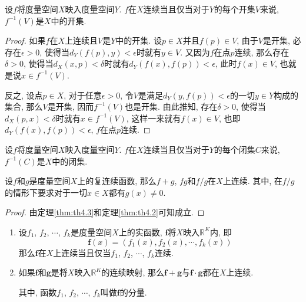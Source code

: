 \documentclass[cn,12pt,math=mtpro2,citestyle=gb7714-2015,bibstyle=gb7714-2015,twocol]{elegantbook}
\newcommand{\R}{\mathbb{R}}
\newcommand{\f}{\mathbold{f}}
\newcommand{\g}{\mathbold{g}}
\begin{document}
\begin{theorem}\label{thm:th4.5}
  设$f$将度量空间$X$映入度量空间$Y$. $f$在$X$连续当且仅当对于$Y$的每个开集$V$来说, $f^{-1}(V)$是$X$中的开集.
\end{theorem}
\begin{proof}
  如果$f$在$X$上连续且$V$是$Y$中的开集. 设$p\in X$并且$f(p)\in V$, 由于$V$是开集, 必存在$\epsilon>0$, 使得当$d_Y(f(p),y)<\epsilon$时就有$y\in V$. 又因为$f$在点$p$连续, 那么存在$\delta>0$, 使得当$d_X(x,p)<\delta$时就有$d_Y(f(x),f(p))<\epsilon$, 此时$f(x)\in V$, 也就是说$x\in f^{-1}(V)$.

  反之, 设点$p\in X$, 对于任意$\epsilon>0$, 令$V$是满足$d_Y(y,f(p))<\epsilon$的一切$y\in Y$构成的集合, 那么$V$是开集, 因而$f^{-1}(V)$也是开集. 由此推知, 存在$\delta>0$, 使得当$d_X(p,x)<\delta$时就有$x\in f^{-1}(V)$, 这样一来就有$f(x)\in V$, 也即$d_Y(f(x),f(p))<\epsilon$, $f$在点$p$连续.

\end{proof}
\begin{corollary}\label{cor:cor4.1}
设$f$将度量空间$X$映入度量空间$Y$. $f$在$X$连续当且仅当对于$Y$的每个闭集$C$来说, $f^{-1}(C)$是$X$中的闭集.
\end{corollary}
\begin{theorem}\label{thm:th4.4}
  设$f$和$g$是度量空间$X$上的复连续函数, 那么$f+g$, $fg$和$f/g$在$X$上连续. 其中, 在$f/g$的情形下要求对于一切$x\in X$都有$g(x)\neq0$.
\end{theorem}
\begin{proof}
  由定理\ref{thm:th4.3}和定理\ref{thm:th4.2}可知成立.

\end{proof}
\begin{theorem}
   \begin{enumerate}[label=(\arabic*)]
  \item 设$f_1$, $f_2$, $\cdots$, $f_k$是度量空间$X$上的实函数, $\f $将$X$映入$\R^K$内, 即
  $$\f(x)=(f_1(x),f_2(x),\cdots,f_k(x))$$
  那么$\f $在$X$上连续当且仅当$f_1$, $f_2$, $\cdots$, $f_k$连续.

  \item 如果$\f $和$\g $是将$X$映入$\R^K$的连续映射, 那么$\f +\g $与$\f \cdot \g $都在$X$上连续.

  其中, 函数$f_1$, $f_2$, $\cdots$, $f_k$叫做$\f $的分量.
  \end{enumerate}
\end{theorem}
\end{document}
